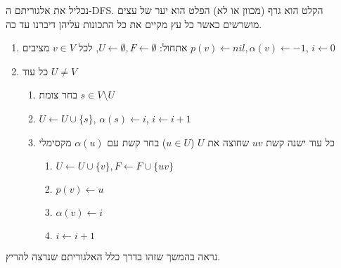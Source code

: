 נכליל את אלגוריתם ה-DFS.
הקלט הוא גרף (מכוון או לא) הפלט הוא יער של עצים מושרשים 
כאשר כל עץ מקיים את כל התכונות עליהן דיברנו עד כה.
\begin{enumerate}
\item
אתחול:
$U \leftarrow \emptyset, F \leftarrow \emptyset$, 
לכל 
$v \in V$
מציבים
$p(v) \leftarrow nil, \alpha(v) \leftarrow -1$,
$i \leftarrow 0$
\item
כל עוד 
$U \neq V$
	\begin{enumerate}
	\item
	בחר צומת 
	$s \in V \setminus U$
	\item
	$U \leftarrow U \cup \{s\}$,
	$\alpha(s) \leftarrow i$,
	$i \leftarrow i + 1$

	\item 
	כל עוד ישנה קשת 
	$uv$
	שחוצה את $U$ 
	($u \in U$)
	בחר קשת עם 
	$\alpha(u)$
	מקסימלי
		\begin{enumerate}
		\item
		$U \leftarrow U \cup \{v\}, F \leftarrow F \cup \{uv\}$
		\item
		$p(v) \leftarrow u$
		\item
		$\alpha(v) \leftarrow i$
		\item
		$i \leftarrow i + 1$
		\end{enumerate}
	\end{enumerate}
\end{enumerate}

נראה בהמשך שזהו בדרך כלל האלגוריתם שנרצה להריץ.
